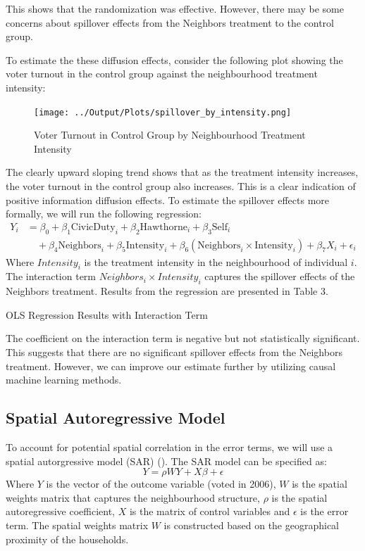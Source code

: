 \documentclass[11pt, draft]{article}
\begin{document}
This shows that the randomization was effective. However, there may be some concerns about spillover effects from the Neighbors treatment to the control group. 

To estimate the these diffusion effects, consider the following plot showing the voter turnout in the control group against the neighbourhood treatment intensity:
\begin{figure}[H]
    \centering
    \texttt{[image: ../Output/Plots/spillover\_by\_intensity.png]}   
    \caption{Voter Turnout in Control Group by Neighbourhood Treatment Intensity}
    \label{fig:figure2}
\end{figure}

The clearly upward sloping trend shows that as the treatment intensity increases, the voter turnout in the control group also increases. This is a clear indication of positive information diffusion effects. To estimate the spillover effects more formally, we will run the following regression:
\begin{equation}
\begin{split}
Y_i &= \beta_0 + \beta_1 \text{CivicDuty}_i + \beta_2 \text{Hawthorne}_i + \beta_3 \text{Self}_i \\
    &\quad + \beta_4 \text{Neighbors}_i + \beta_5 \text{Intensity}_i + \beta_6 (\text{Neighbors}_i \times \text{Intensity}_i) + \beta_7 X_i + \epsilon_i
\end{split}
\end{equation}
Where $Intensity_i$ is the treatment intensity in the neighbourhood of individual $i$. The interaction term $Neighbors_i \times Intensity_i$ captures the spillover effects of the Neighbors treatment. Results from the regression are presented in Table 3.
\begin{table}[H]
    
    \caption{OLS Regression Results with Interaction Term}        
\end{table}
The coefficient on the interaction term is negative but not statistically significant. This suggests that there are no significant spillover effects from the Neighbors treatment. However, we can improve our estimate further by utilizing causal machine learning methods.

\subsection{Spatial Autoregressive Model}
To account for potential spatial correlation in the error terms, we will use a spatial autorgressive model (SAR) (\cite{lord_chapter_2021}). The SAR model can be specified as:
\begin{equation}
    Y = \rho W Y + X\beta + \epsilon
\end{equation}
Where $Y$ is the vector of the outcome variable (voted in 2006), $W$ is the spatial weights matrix that captures the neighbourhood structure, $\rho$ is the spatial autoregressive coefficient, $X$ is the matrix of control variables and $\epsilon$ is the error term. The spatial weights matrix $W$ is constructed based on the geographical proximity of the households.
\end{document}
